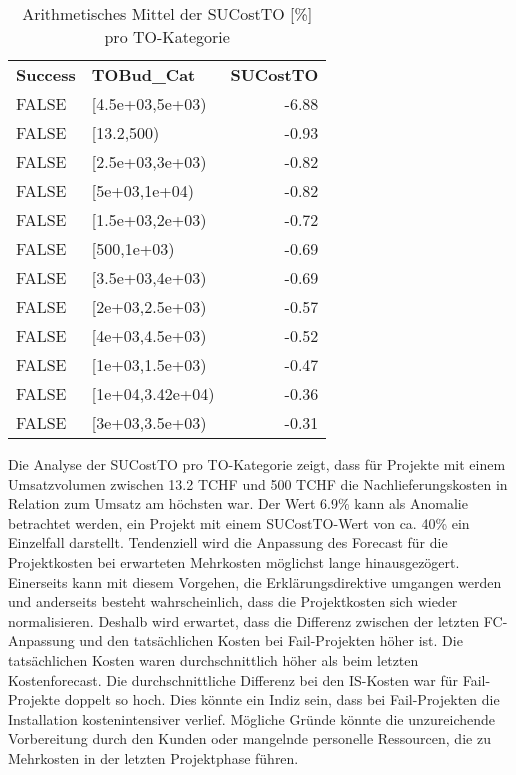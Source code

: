 \begin{table}[htbp]
	\centering
	\caption{Arithmetisches Mittel der SUCostTO [\%] pro TO-Kategorie}
	\begin{tabular}{llr}
		\textbf{Success} & \textbf{TOBud\_Cat} & \multicolumn{1}{l}{\textbf{SUCostTO}} \\
		FALSE & [4.5e+03,5e+03) & -6.88 \\
		FALSE & [13.2,500) & -0.93 \\
		FALSE & [2.5e+03,3e+03) & -0.82 \\
		FALSE & [5e+03,1e+04) & -0.82 \\
		FALSE & [1.5e+03,2e+03) & -0.72 \\
		FALSE & [500,1e+03) & -0.69 \\
		FALSE & [3.5e+03,4e+03) & -0.69 \\
		FALSE & [2e+03,2.5e+03) & -0.57 \\
		FALSE & [4e+03,4.5e+03) & -0.52 \\
		FALSE & [1e+03,1.5e+03) & -0.47 \\
		FALSE & [1e+04,3.42e+04) & -0.36 \\
		FALSE & [3e+03,3.5e+03) & -0.31 \\
	\end{tabular}%
	\label{tab:addlabel}%
\end{table}%
Die Analyse der SUCostTO pro TO-Kategorie zeigt, dass für Projekte mit einem Umsatzvolumen zwischen 13.2 TCHF und 500 TCHF die Nachlieferungskosten in Relation zum Umsatz am höchsten war. Der Wert 6.9\% kann als Anomalie betrachtet werden, ein Projekt mit einem SUCostTO-Wert von ca. 40\% ein Einzelfall darstellt.
\newline\newline Tendenziell wird die Anpassung des Forecast für die Projektkosten bei erwarteten Mehrkosten möglichst lange hinausgezögert. Einerseits kann mit diesem Vorgehen, die Erklärungsdirektive umgangen werden und anderseits besteht wahrscheinlich, dass die Projektkosten sich wieder normalisieren. Deshalb wird erwartet, dass die Differenz zwischen der letzten FC-Anpassung und den tatsächlichen Kosten bei Fail-Projekten höher ist. Die tatsächlichen Kosten waren durchschnittlich höher als beim letzten Kostenforecast. Die durchschnittliche Differenz bei den IS-Kosten war für Fail-Projekte doppelt so hoch. Dies könnte ein Indiz sein, dass bei Fail-Projekten die Installation kostenintensiver verlief. Mögliche Gründe könnte die unzureichende Vorbereitung durch den Kunden oder mangelnde personelle Ressourcen, die zu Mehrkosten in der letzten Projektphase führen. 
